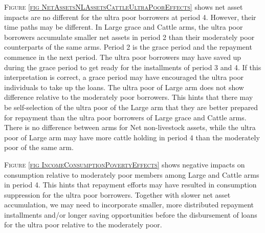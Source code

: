 

\textsc{Figure \ref{fig NetAssetsNLAssetsCattleUltraPoorEffects}} shows net asset impacts are no different for the ultra poor borrowers at period 4. However, their time paths may be different. In \textsf{Large grace} and \textsf{Cattle} arms, the ultra poor borrowers accumulate smaller net assets in period 2 than their moderately poor counterparts of the same arms. Period 2 is the grace period and the repayment commence in the next period. The ultra poor borrowers may have saved up during the grace period to get ready for the installments of period 3 and 4. If this interpretation is correct, a grace period may have encouraged the ultra poor individuals to take up the loans. The ultra poor of \textsf{Large} arm does not show difference relative to the moderately poor borrowers. This hints that there may be self-selection of the ultra poor of the \textsf{Large} arm that they are better prepared for repayment than the ultra poor borrowers of \textsf{Large grace} and \textsf{Cattle} arms. There is no difference between arms for \textsf{Net non-livestock assets}, while the ultra poor of \textsf{Large} arm may have more cattle holding in period 4 than the moderately poor of the same arm. 

\textsc{Figure \ref{fig IncomeConsumptionPovertyEffects}} shows negative impacts on consumption relative to moderately poor members among \textsf{Large} and \textsf{Cattle} arms in period 4. This hints that repayment efforts may have resulted in consumption suppression for the ultra poor borrowers. Together with slower net asset accumulation, we may need to incorporate smaller, more distributed repayment installments and/or longer saving opportunities before the disbursement of loans for the ultra poor relative to the moderately poor. 




